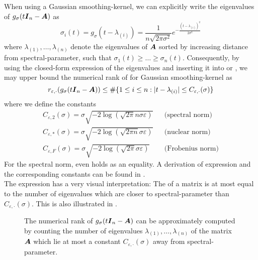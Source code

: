 When using a Gaussian \gls{smoothing-kernel}, we can explicitly write
the eigenvalues of $g_{\sigma}(t\boldsymbol{I}_n - \boldsymbol{A})$ as
\begin{equation}
    \sigma_i(t) = g_{\sigma}(t - \lambda_{(i)}) = \frac{1}{n \sqrt{2 \pi \sigma^2}} e^{-\frac{(t - \lambda_{(i)})^2}{2 \sigma^2}}
    \label{equ:3-nystrom-kernel-function-eigenvalues}
\end{equation}
where $\lambda_{(1)}, \dots, \lambda_{(n)}$ denote the
eigenvalues of $\boldsymbol{A}$ sorted by increasing
distance from \gls{spectral-parameter}, such that $\sigma_1(t) \geq \dots \geq \sigma_n(t)$.
Consequently, by using the closed-form expression of the eigenvalues 
and inserting it into  or
,
we may upper bound the numerical rank of 
for Gaussian \gls{smoothing-kernel} as
\begin{equation}
    r_{\varepsilon, \cdot}(g_{\sigma}(t\boldsymbol{I}_n - \boldsymbol{A})) \leq \#\{1\leq i\leq n: |t - \lambda_{(i)}| \leq C_{\varepsilon, \cdot}(\sigma)\}
    \label{equ:3-nystrom-kernel-numerical-rank}
\end{equation}
where we define the constants
\begin{align}
    C_{\varepsilon, 2}(\sigma) = \sigma \sqrt{-2 \log(\sqrt{2 \pi} n \sigma \varepsilon)} && \text{(spectral norm)} \label{equ:3-nystrom-kernel-numerical-rank-spectral-constant} \\
    C_{\varepsilon, \ast}(\sigma) = \sigma \sqrt{-2 \log(\sqrt{2 \pi n} \sigma \varepsilon)} && \text{(nuclear norm)} \label{equ:3-nystrom-kernel-numerical-rank-nuclear-constant} \\
    C_{\varepsilon, F}(\sigma) = \sigma \sqrt{-2 \log(\sqrt{2 \pi} \sigma \varepsilon)} && \text{(Frobenius norm)} \label{equ:3-nystrom-kernel-numerical-rank-frobenius-constant} 
\end{align}
For the spectral norm,  even holds
as an equality.
A derivation of expression 
and the corresponding constants can be found in .\\

The expression  has a very
visual interpretation: The  of a matrix is at most
equal to the number of eigenvalues which are closer to \gls{spectral-parameter}
than $C_{\varepsilon, \cdot}(\sigma)$.
This is also illustrated in .\\
\begin{figure}[ht]
    \centering
    
    \caption{The numerical rank of $g_{\sigma}(t\boldsymbol{I}_n - \boldsymbol{A})$ can be
        approximately computed by counting the number of eigenvalues
        $\lambda_{(1)}, \dots, \lambda_{(n)}$ of the matrix $\boldsymbol{A}$ which lie at most
        a constant $C_{\varepsilon, \cdot}(\sigma)$ away from \gls{spectral-parameter}.}
    \label{fig:3-nystrom-numerical-rank-constant}
\end{figure}

